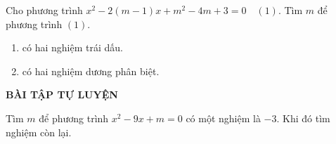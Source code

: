 \begin{vd}%
	Cho phương trình $x^2-2(m-1)x+m^2-4m+3=0\quad (1)$. Tìm $m$ để phương trình $(1)$.
	\begin{enumerate}
		\item có hai nghiệm trái dấu.
		\item có hai nghiệm dương phân biệt.
	\end{enumerate}
\end{vd}


\begin{center}
	\textbf{BÀI TẬP TỰ LUYỆN}
\end{center}	

\begin{bt}%
	Tìm $m$ để phương trình $x^2-9x+m=0$ có một nghiệm là $-3$. Khi đó tìm nghiệm còn lại.
\end{bt}

